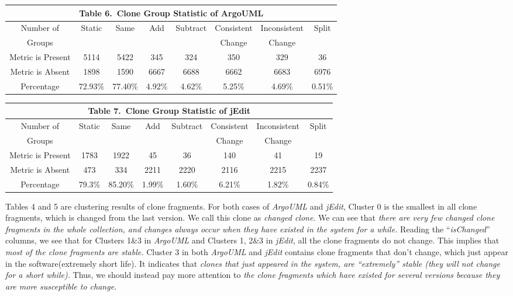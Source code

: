{
\begin{table}[!htb]
\tabcolsep=2.5pt 
\scriptsize
\begin{center}
\begin{tabular}{|c|c|c|c|c|c|c|c|}
\multicolumn{8}{c}{\bf Table 6.\ Clone Group Statistic of ArgoUML}\\ \hline
Number of&\multirow{2}{*}{Static}&\multirow{2}{*}{Same}&\multirow{2}{*}{Add}&\multirow{2}{*}{Subtract}&Consistent&Inconsistent&\multirow{2}{*}{Split}\\ 
Groups&&&&&Change&Change&\\ \hline
Metric is Present	&5114	&5422	&345	&324	&350	&329	&36\\ \hline
Metric is Absent	&1898	&1590	&6667	&6688	&6662	&6683	&6976\\ \hline
Percentage	&72.93\%	&77.40\%	&4.92\%	&4.62\%	&5.25\%	&4.69\%	&0.51\%\\ \hline
\end{tabular}
\end{center}
\end{table}}
{
\begin{table}[!htb]
\tabcolsep=2.5pt 
\scriptsize
\begin{center}
\begin{tabular}{|c|c|c|c|c|c|c|c|}
\multicolumn{8}{c}{\bf Table 7.\  Clone Group Statistic of jEdit}\\  \hline
Number of&\multirow{2}{*}{Static}&\multirow{2}{*}{Same}&\multirow{2}{*}{Add}&\multirow{2}{*}{Subtract}&Consistent&Inconsistent&\multirow{2}{*}{Split}\\ 
Groups&&&&&Change&Change&\\ \hline
Metric is Present	&1783	&1922	&45	&36	&140	&41	&19\\ \hline
Metric is Absent	&473	&334	&2211	&2220	&2116	&2215	&2237\\ \hline
Percentage	&79.3\%	&85.20\%	&1.99\%	&1.60\%	&6.21\%	&1.82\%	&0.84\%\\ \hline
\end{tabular}
\end{center}
\end{table}
}

Tables 4 and 5 are clustering results of clone fragments.  For both cases of {\em ArgoUML} and {\em jEdit}, Cluster 0 is the smallest in all clone fragments, which is changed from the last version. We call this clone as {\em changed clone}. We can see that {\em there are very few changed clone fragments in the whole collection, and changes always occur when they have existed in the system for a while.} Reading the ``{\em isChanged}'' columns, we see that for Clusters 1\&3 in {\em ArgoUML} and Clusters 1, 2\&3 in {\em jEdit}, all the clone fragments do not change. This implies that {\em most of the clone fragments are stable.} Cluster 3 in both {\em ArgoUML} and {\em jEdit} contains clone fragments that don't change, which just appear in the software(extremely short life). It indicates that {\em clones that just appeared in the system, are ``extremely'' stable (they will not change for a short while).} Thus, we should instead pay more attention to {\em the clone fragments which have existed for several versions because they are more susceptible to change.}  

